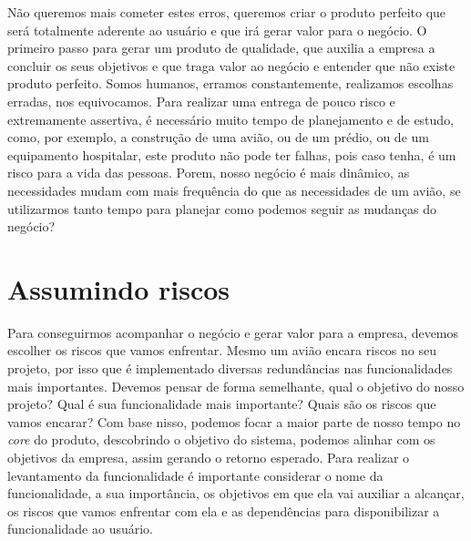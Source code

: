     Não queremos mais cometer estes erros, queremos criar o produto perfeito que
    será totalmente aderente ao usuário e que irá gerar valor para o negócio. \newline
    O primeiro passo para gerar um produto de qualidade, que auxilia a empresa a
    concluir os seus objetivos e que traga valor ao negócio e entender que não
    existe produto perfeito. Somos humanos, erramos constantemente, realizamos
    escolhas erradas, nos equivocamos. Para realizar uma entrega de pouco risco
    e extremamente assertiva, é necessário muito tempo de planejamento e de estudo,
    como, por exemplo, a construção de uma avião, ou de um prédio, ou de um
    equipamento hospitalar, este produto não pode ter falhas, pois caso
    tenha, é um risco para a vida das pessoas. Porem, nosso negócio é mais
    dinâmico, as necessidades mudam com mais frequência do que as necessidades de
    um avião, se utilizarmos tanto tempo para planejar como podemos seguir as
    mudanças do negócio?

    \section{Assumindo riscos}
      Para conseguirmos acompanhar o negócio e gerar valor para a empresa, devemos
      escolher os riscos que vamos enfrentar. Mesmo um avião encara riscos no seu
      projeto, por isso que é implementado diversas redundâncias nas funcionalidades
      mais importantes. Devemos pensar de forma semelhante, qual o objetivo do nosso
      projeto? Qual é sua funcionalidade mais importante? Quais são os riscos que
      vamos encarar? \newline
      Com base nisso, podemos focar a maior parte de nosso tempo no \textit{core}
      do produto, descobrindo o objetivo do sistema, podemos alinhar com os objetivos
      da empresa, assim gerando o retorno esperado. Para realizar o levantamento
      da funcionalidade é importante considerar o nome da funcionalidade, a sua
      importância, os objetivos em que ela vai auxiliar a alcançar, os riscos
      que vamos enfrentar com ela e as dependências para disponibilizar a
      funcionalidade ao usuário.


